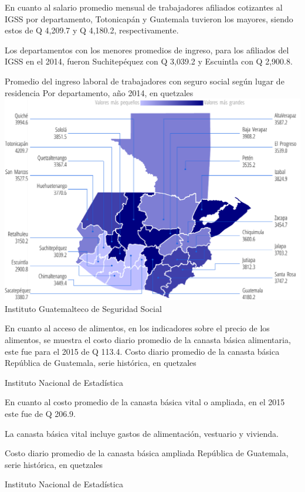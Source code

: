   {%
  En cuanto al salario promedio mensual de trabajadores afiliados cotizantes al IGSS por departamento, Totonicapán y Guatemala tuvieron los mayores, siendo estos de Q 4,209.7 y Q 4,180.2, respectivamente.
  
  Los departamentos con los menores promedios de ingreso, para los afiliados del IGSS en el 2014, fueron Suchitepéquez con Q 3,039.2 y Escuintla con Q 2,900.8.}%
  {%
  	Promedio del ingreso laboral de trabajadores con seguro social según lugar de residencia
  } %
  {%
  	Por departamento, año 2014, en quetzales} %
  {%
  	\includegraphics[width=52\cuadri]{graficas/3_06.pdf}}%
  {%
  	Instituto Guatemalteco de Seguridad Social} %


%
{%
En cuanto al acceso de alimentos, en los indicadores sobre el precio de los alimentos, se muestra el costo diario promedio de la canasta básica alimentaria, este fue para el 2015 de Q 113.4.}%
{%
Costo  diario promedio de la canasta básica } %
{%
	República de Guatemala, serie histórica, en quetzales } %
{%
	\begin{tikzpicture}[x=1pt,y=1pt]    \end{tikzpicture}}%
{%
	Instituto Nacional de Estadística} %


%
{%
En cuanto al costo promedio de la canasta básica vital o ampliada, en el 2015 este fue de Q 206.9.

La canasta básica vital incluye gastos de alimentación, vestuario y vivienda.}%
{%
	Costo diario promedio  de la canasta básica ampliada } %
{%
	República de Guatemala, serie histórica, en quetzales } %
{%
	\begin{tikzpicture}[x=1pt,y=1pt]    \end{tikzpicture}}%
{%
	Instituto Nacional de Estadística} %
